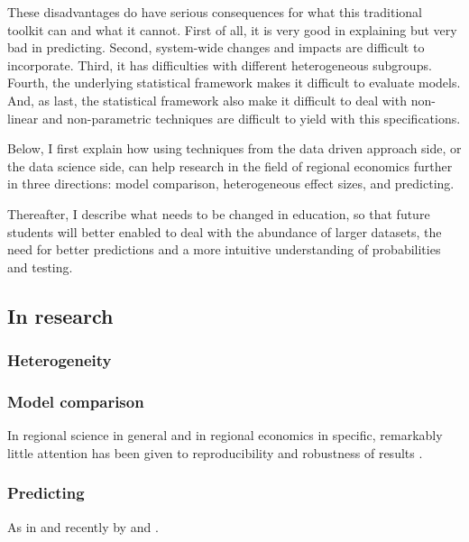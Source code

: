 \documentclass[fleqn,10pt]{SelfArx} %
\begin{document}
These disadvantages do have serious consequences for what this traditional
toolkit can and what it cannot. First of all, it is very
good in explaining but very bad in predicting. Second, system-wide changes and
impacts are difficult to incorporate. Third, it has difficulties with different
heterogeneous subgroups. Fourth, the underlying statistical framework makes it
difficult to evaluate models. And, as last, the statistical framework also make
it difficult to deal with non-linear and non-parametric techniques are
difficult to yield with this specifications.

Below, I first explain how using techniques from the data driven approach side, or the
data science side, can help research in  the field of regional economics further in three
directions: model comparison, heterogeneous effect sizes, and predicting.

Thereafter, I describe what needs to be changed in education, so that future
students will better enabled to deal with the abundance of larger datasets, the
need for better predictions and a more intuitive understanding of probabilities
and testing.


\subsection{In research}

\subsubsection{Heterogeneity}

\citep{Thissen2016, Graaff2012, DeGraaff2012}

\subsubsection{Model comparison}

In regional science in general and in regional economics in specific, remarkably little attention has been given to reproducibility and robustness of results \citep[with some exceptions as, amongst some others, by][]{Rey:2014cl,arribas2015woow, Arribas2016}.

\subsubsection{Predicting}

As in \citet{Bayer2004, Bayer2007a} and recently by \citet{Wang2016} and \citet{Bernasco2016}.
\end{document}
